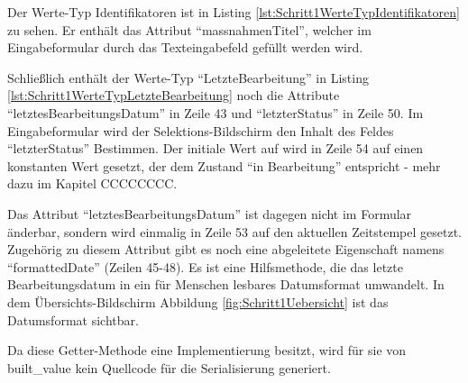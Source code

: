 
Der Werte-Typ Identifikatoren ist in Listing \ref{lst:Schritt1WerteTypIdentifikatoren} zu sehen.  Er enthält das Attribut \enquote{massnahmenTitel}, welcher im Eingabeformular durch das Texteingabefeld gefüllt werden wird. 


Schließlich enthält der Werte-Typ \enquote{LetzteBearbeitung} in Listing \ref{lst:Schritt1WerteTypLetzteBearbeitung} noch die Attribute \enquote{letztesBearbeitungsDatum} in Zeile 43 und \enquote{letzterStatus} in Zeile 50. Im Eingabeformular wird der Selektions-Bildschirm den Inhalt des Feldes \enquote{letzterStatus} Bestimmen. Der initiale Wert auf wird in Zeile 54 auf einen konstanten Wert gesetzt, der dem Zustand \enquote{in Bearbeitung} entspricht - mehr dazu im Kapitel CCCCCCCC.

Das Attribut \enquote{letztesBearbeitungsDatum} ist dagegen nicht im Formular änderbar, sondern wird einmalig in Zeile 53 auf den aktuellen Zeitstempel gesetzt. Zugehörig zu diesem Attribut gibt es noch eine abgeleitete Eigenschaft namens \enquote{formattedDate} (Zeilen 45-48).  Es ist eine Hilfsmethode, die das letzte Bearbeitungsdatum in ein für Menschen lesbares Datumsformat umwandelt. In dem Übersichts-Bildschirm Abbildung \ref{fig:Schritt1Uebersicht} ist das Datumsformat sichtbar.

Da diese Getter-Methode eine Implementierung besitzt, wird für sie von built_value kein Quellcode für die Serialisierung generiert.



